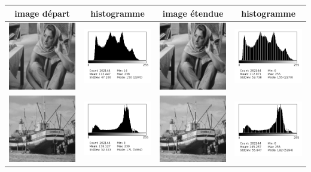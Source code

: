 \documentclass[a4paper,11pt]{article}
\begin{document}
  \begin{tabular}{|c|c|c|c|}
   \hline
   image départ & histogramme & image étendue & histogramme\\
   \hline
   \includegraphics[width=3cm]{barb.png} & \includegraphics[width=3cm]{../histo/image/hist_barb.png} & \includegraphics[width=3cm]{../res/barbQ1.png} & \includegraphics[width=3cm]{../histo/resultat/hist_barbQ1.png}\\
   \hline
   \includegraphics[width=3cm]{boat.png} & \includegraphics[width=3cm]{../histo/image/hist_boat.png} & \includegraphics[width=3cm]{../res/boatQ1.png} & \includegraphics[width=3cm]{../histo/resultat/hist_boatQ1.png}\\

\end{tabular}
\end{document}
